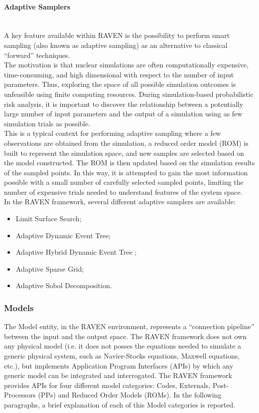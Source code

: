 \paragraph{Adaptive Samplers}~\\ 
A key feature available within RAVEN is the possibility to perform smart sampling (also known as adaptive sampling) as an alternative to classical ``forward'' techniques.
\\The motivation is that nuclear simulations are often computationally expensive, time-consuming, and high dimensional with respect to the number of input parameters. Thus, exploring the space of all possible simulation outcomes is unfeasible using finite computing resources. During simulation-based probabilistic risk analysis, it is important to discover the relationship between a potentially large number of input parameters and the output of a simulation using as few simulation trials as possible. 
\\This is a typical context for performing adaptive sampling where a few observations are obtained from the simulation, a reduced order model (ROM) is built to represent the simulation space, and new samples are selected based on the model constructed. The ROM is then updated based on the simulation results of the sampled points. In this way, it is attempted to gain the most information possible with a small number of carefully selected sampled points, limiting the number of expensive trials needed to understand features of the system space.
\\In the RAVEN framework, several different adaptive samplers are available:
\begin{itemize}
\item Limit Surface Search;
\item Adaptive Dynamic Event Tree;
\item Adaptive Hybrid Dynamic Event Tree ;
\item Adaptive Sparse Grid;
\item Adaptive Sobol Decomposition.
\end{itemize}

\subsubsection{Models} 
The Model entity, in the RAVEN environment, represents a ``connection pipeline'' between the input and the output space. The RAVEN framework does not own any physical model (i.e. it does not posses the equations needed to simulate a generic physical system, such as Navier-Stocks equations, Maxwell equations, etc.), but implements Application Program Interfaces (APIs) by which any generic model can be integrated and interrogated. The RAVEN framework provides APIs for four different model categories: Codes, Externals, Post-Processors (PPs) and Reduced Order Models (ROMs). In the following paragraphs, a brief explanation of each of this Model categories is reported. 
